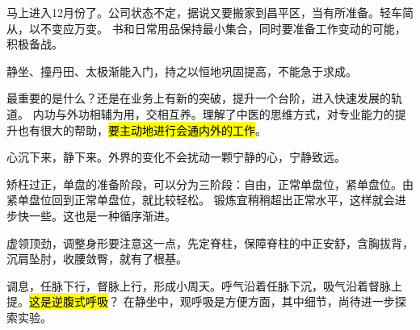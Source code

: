 马上进入12月份了。公司状态不定，据说又要搬家到昌平区，当有所准备。轻车简从，以不变应万变。
书和日常用品保持最小集合，同时要准备工作变动的可能，积极备战。

静坐、撞丹田、太极渐能入门，持之以恒地巩固提高，不能急于求成。

最重要的是什么？还是在业务上有新的突破，提升一个台阶，进入快速发展的轨道。
内功与外功相辅为用，交相互养。理解了中医的思维方式，对专业能力的提升也有很大的帮助，\hl{要主动地进行会通内外的工作}。

心沉下来，静下来。外界的变化不会扰动一颗宁静的心，宁静致远。

矫枉过正，单盘的准备阶段，可以分为三阶段：自由，正常单盘位，紧单盘位。由紧单盘位回到正常单盘位，就比较轻松。
锻炼宜稍稍超出正常水平，这样就会进步快一些。这也是一种循序渐进。

虚领顶劲，调整身形要注意这一点，先定脊柱，保障脊柱的中正安舒，含胸拔背，沉肩坠肘，收腰敛臀，就有了根基。

调息，任脉下行，督脉上行，形成小周天。呼气沿着任脉下沉，吸气沿着督脉上提。\hl{这是逆腹式呼吸}？
在静坐中，观呼吸是方便方面，其中细节，尚待进一步探索实验。
